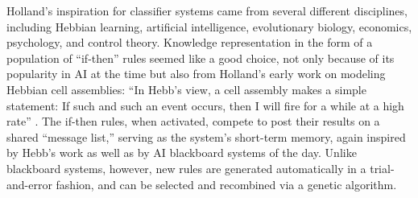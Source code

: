 \documentclass{sig-alternate}
\begin{document}






Holland's inspiration for classifier systems came from several
different disciplines, including Hebbian
learning, artificial intelligence, evolutionary biology, economics,
psychology, and control theory.
Knowledge representation in the form of a population of ``if-then''
rules seemed like a good choice, not only because of its popularity in
AI at the time but also from Holland's early work on modeling Hebbian
cell assemblies: ``In Hebb's view, a cell assembly makes a simple
statement: If such and such an event occurs, then I will fire for a
while at a high rate'' \cite{Waldrop1993}.  The if-then rules, when
activated, compete to post their results on a shared ``message list,''
serving as the system's short-term memory, again inspired by Hebb's
work as well as by AI blackboard systems of the day.  Unlike blackboard
systems, however, new rules are generated automatically in a
trial-and-error fashion, and can be selected and recombined via a
genetic algorithm.
\end{document}
